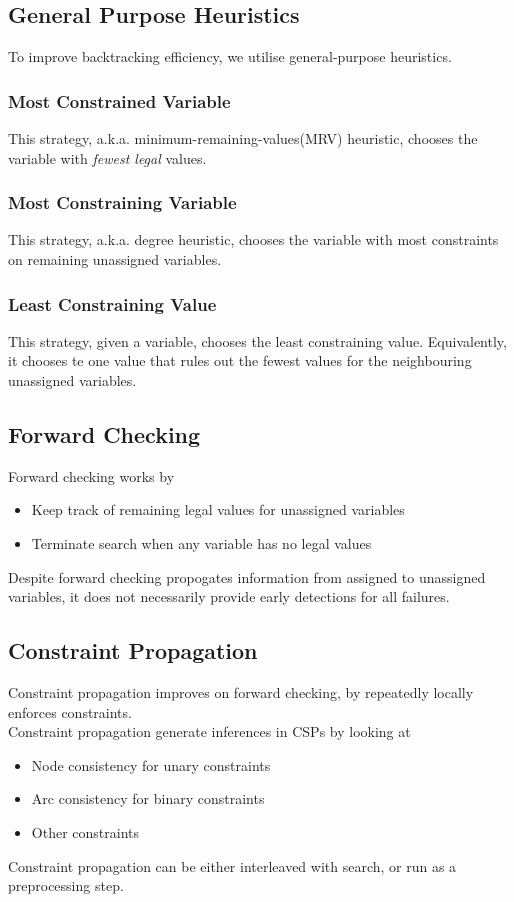 \documentclass[12pt]{article}
\theoremstyle{definition}
\begin{document}
\subsection{General Purpose Heuristics}
To improve backtracking efficiency, we utilise general-purpose heuristics.
\subsubsection{Most Constrained Variable}
This strategy, a.k.a. minimum-remaining-values(MRV) heuristic, chooses the variable with \textit{fewest legal} values.
\subsubsection{Most Constraining Variable}
This strategy, a.k.a. degree heuristic, chooses the variable with most constraints on remaining unassigned variables.
\subsubsection{Least Constraining Value}
This strategy, given a variable, chooses the least constraining value. Equivalently, it chooses te one value that rules out the fewest values for the neighbouring unassigned variables.
\subsection{Forward Checking}
Forward checking works by
\begin{itemize}
	\item Keep track of remaining legal values for unassigned variables
	\item Terminate search when any variable has no legal values
\end{itemize}
Despite forward checking propogates information from assigned to unassigned variables, it does not necessarily provide early detections for all failures.
\subsection{Constraint Propagation}
Constraint propagation improves on forward checking, by repeatedly locally enforces constraints.\\Constraint propagation generate inferences in CSPs by looking at
\begin{itemize}
	\item Node consistency for unary constraints
	\item Arc consistency for binary constraints
	\item Other constraints
\end{itemize}
Constraint propagation can be either interleaved with search, or run as a preprocessing step.
\end{document}
